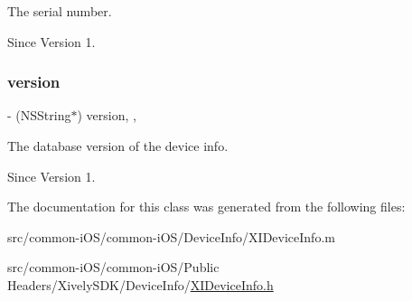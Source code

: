 The serial number. 

\begin{DoxySince}{Since}
Version 1. 
\end{DoxySince}
\hypertarget{class_x_i_device_info_aa4b01ce3773d036a1cec1d63381f8d72}{}\label{class_x_i_device_info_aa4b01ce3773d036a1cec1d63381f8d72} 
\subsubsection{\texorpdfstring{version}{version}}
{\footnotesize\ttfamily -\/ (N\+S\+String$\ast$) version\hspace{0.3cm}{\ttfamily [read]}, {\ttfamily [nonatomic]}, {\ttfamily [assign]}}



The database version of the device info. 

\begin{DoxySince}{Since}
Version 1. 
\end{DoxySince}


The documentation for this class was generated from the following files\+:\begin{DoxyCompactItemize}
\item 
src/common-\/i\+O\+S/common-\/i\+O\+S/\+Device\+Info/X\+I\+Device\+Info.\+m\item 
src/common-\/i\+O\+S/common-\/i\+O\+S/\+Public Headers/\+Xively\+S\+D\+K/\+Device\+Info/\hyperlink{_x_i_device_info_8h}{X\+I\+Device\+Info.\+h}\end{DoxyCompactItemize}
